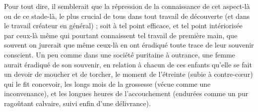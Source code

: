 Pour tout dire, il semblerait que la répression de la connaissance de cet aspect-là ou de ce stade-là, le plus crucial de tous dans tout travail de découverte (et dans le travail créateur en général) ; soit à tel point efficace, et tel point intériorisée par ceux-là même qui pourtant connaissent tel travail de première main, que souvent on jurerait que même ceux-là en ont éradiqué toute trace de leur souvenir conscient. Un peu comme dans une société puritaine à outrance, une femme aurait éradiqué de son souvenir, en relation à chacun de ces enfants qu'elle se fait un devoir de moucher et de torcher, le moment de l'étreinte (subie à contre-cœur) qui le fit concevoir, les longs mois de la grossesse (vécue comme une inconvenance), et les longues heures de l'accouchement (endurées comme un pur ragoûtant calvaire, suivi enfin d'une délivrance).

